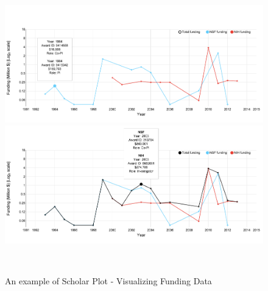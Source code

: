 \begin{figure}[!htb]
  \centering
  \includegraphics[width=1\columnwidth]{figures/fig_funding_default}
  \includegraphics[width=1\columnwidth]{figures/fig_funding_total}
  \caption{An example of Scholar Plot - Visualizing Funding Data}~\label{fig:funding}
\end{figure}



